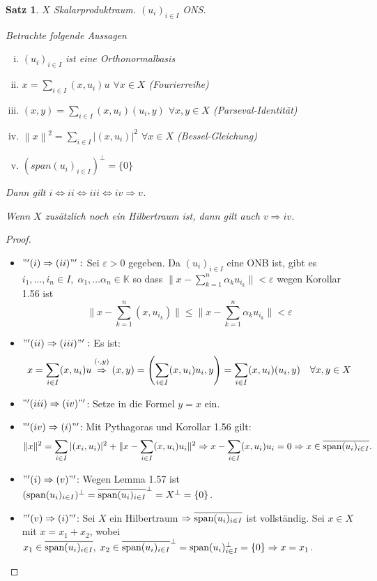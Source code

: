 \documentclass[ngerman]{report}
\theoremstyle{plain}%
\newtheorem{thm}{Satz}[chapter]
\theoremstyle{definition}%
\theoremstyle{myStyle}
\newcommand{\K}{\mathbb{K}}
\newcommand{\aufspan}{\textnormal{span}}
\newcommand{\norm}[1]{\left \|#1\right\| }
\newcommand{\df}[1][]{%
	\overset{#1}{\Rightarrow}
}
\newcommand{\aq}{\Leftrightarrow} %
\newcommand{\ff}[3]{(#1_#2)_{#2\in#3}}
\begin{document}
 	\begin{thm}
		$X$ Skalarproduktraum. $\ff{u}{i}{I}$ ONS.\par
		Betrachte folgende Aussagen
			\begin{enumerate}[(i)]
				\item $\ff{u}{i}{I}$ ist eine Orthonormalbasis
				\item $x = \sum_{i\in I} (x, u_i)u$ $\forall x\in X$ (Fourierreihe)
				\item $(x,y) = \sum_{i\in I}(x,u_i)(u_i,y)$ $\forall x,y \in X$ (Parseval-Identität)
				\item $\norm{x}^2 = \sum_{i\in I}|(x,u_i)|^2$ $\forall x\in X$ (Bessel-Gleichung)
				\item $(span\ff{u}{i}{I})^\perp = \{0\}$
			\end{enumerate}
			Dann gilt $i \aq ii \aq iii \aq iv \df v$.\par
			Wenn $X$ zusätzlich noch ein Hilbertraum ist, dann gilt auch $v\df iv$.
	\end{thm}	
	\begin{proof}
		\begin{itemize}[]
		\item $"'(i)\df(ii)"':$ Sei $\varepsilon > 0$ gegeben. Da $(u_i)_{i\in I}$ eine ONB ist, gibt es $i_1,\dots,i_n\in I,\;\alpha_1,\dots \alpha_n \in \K$ so dass $\|x- \sum^n_{k=1} \alpha_k u_{i_k}\| < \varepsilon$ wegen Korollar 1.56 ist
		$$\|x- \sum^n_{k=1} (x, u_{i_k})\| \leq \|x-\sum^n_{k=1} \alpha_k u_{i_k}\| < \varepsilon$$
		\item $"'(ii) \df (iii)"':$ Es ist:
		$$x = \sum_{i\in I} (x, u_i)u \overset{(\cdot, y)}{\df} (x,y)=\left(\sum_{i\in I} (x, u_i)u_i,y\right)=\sum_{i\in I} (x,u_i)(u_i,y)\quad \forall x,y\in X$$
		\item $"'(iii) \df (iv)"'$: Setze in die Formel $y=x$ ein.
		\item $"'(iv) \df (i)"'$: Mit Pythagoras und Korollar 1.56 gilt:
		$$\|x\|^2 = \sum_{i\in I} |(x_i,u_i)|^2 + \|x- \sum_{i\in I} (x,u_i)u_i\|^2 \df x- \sum_{i\in I} (x,u_i)u_i = 0 \df x \in \overline{\aufspan (u_i)_{i\in I}}.$$
		\item $"'(i) \df (v)"'$: Wegen Lemma 1.57 ist $(\aufspan (u_i)_{i\in I})^\perp =\overline{\aufspan (u_i)_{i\in I}}^\perp = X^\perp = \{0\}$.
		\item $"'(v)\df(i)"'$: Sei $X$ ein Hilbertraum $\df \overline{\aufspan (u_i)_{i\in I}}$ ist vollständig. Sei $x\in X$ mit $x = x_1+x_2$, wobei $x_1 \in \overline{\aufspan (u_i)_{i\in I}},\;x_2\in \overline{\aufspan (u_i)_{i\in I}}^\perp =  \aufspan (u_i)_{i\in I}^\perp = \{0\} \df x = x_1$.
		\end{itemize}
	\end{proof}
\end{document}
